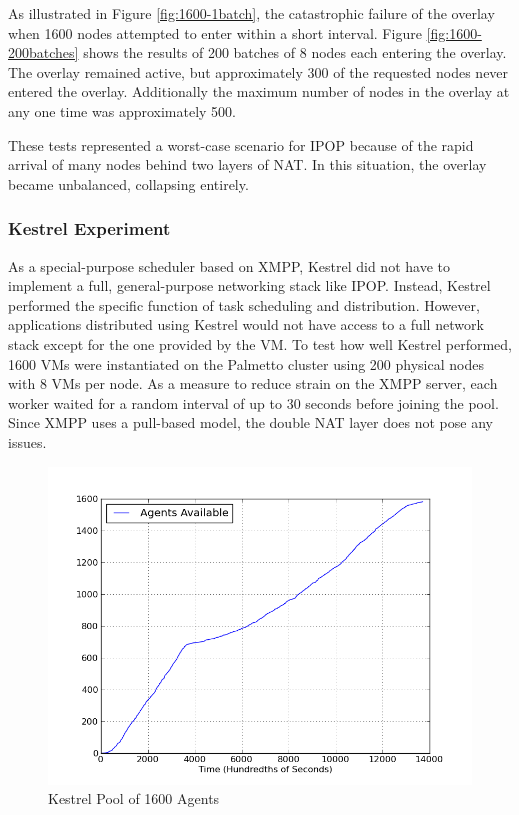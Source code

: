 As illustrated in Figure \ref{fig:1600-1batch}, the catastrophic
failure of the overlay when 1600 nodes attempted to enter within a
short interval. Figure \ref{fig:1600-200batches} shows the results
of 200 batches of 8 nodes each entering the overlay. The overlay remained
active, but approximately 300 of the requested nodes never entered
the overlay. Additionally the maximum number of nodes in the overlay
at any one time was approximately 500.

These tests represented a worst-case scenario for IPOP because of
the rapid arrival of many nodes behind two layers of NAT. In this
situation, the overlay became unbalanced, collapsing entirely.


\subsubsection{\label{sub:Kestrel-Experiment}Kestrel Experiment} 
As a special-purpose scheduler based on XMPP, Kestrel did not have
to implement a full, general-purpose networking stack like IPOP. Instead,
Kestrel performed the specific function of task scheduling and distribution.
However, applications distributed using Kestrel would not have access
to a full network stack except for the one provided by the VM. To
test how well Kestrel performed, 1600 VMs were instantiated on the
Palmetto cluster using 200 physical nodes with 8 VMs per node. As
a measure to reduce strain on the XMPP server, each worker waited
for a random interval of up to 30 seconds before joining the pool.
Since XMPP uses a pull-based model, the double NAT layer does not
pose any issues.

%
\begin{figure}
\includegraphics[width=1\columnwidth]{figures/startup}
\caption{\label{fig:Kestrel-Pool}Kestrel Pool of 1600 Agents}
\end{figure}


